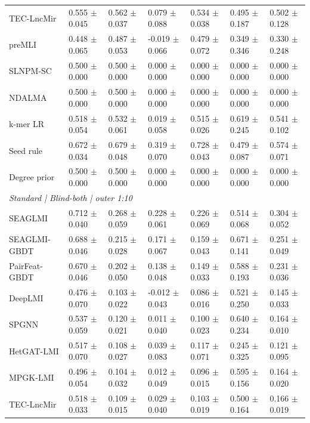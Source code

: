 \begin{landscape}
{\begin{longtable}{lllllll}
TEC-LncMir & 0.555 $\pm$ 0.045 & 0.562 $\pm$ 0.037 & 0.079 $\pm$ 0.088 & 0.534 $\pm$ 0.038 & 0.495 $\pm$ 0.187 & 0.502 $\pm$ 0.128 \\
preMLI & 0.448 $\pm$ 0.065 & 0.487 $\pm$ 0.053 & -0.019 $\pm$ 0.066 & 0.479 $\pm$ 0.072 & 0.349 $\pm$ 0.346 & 0.330 $\pm$ 0.248 \\
SLNPM-SC & 0.500 $\pm$ 0.000 & 0.500 $\pm$ 0.000 & 0.000 $\pm$ 0.000 & 0.000 $\pm$ 0.000 & 0.000 $\pm$ 0.000 & 0.000 $\pm$ 0.000 \\
NDALMA & 0.500 $\pm$ 0.000 & 0.500 $\pm$ 0.000 & 0.000 $\pm$ 0.000 & 0.000 $\pm$ 0.000 & 0.000 $\pm$ 0.000 & 0.000 $\pm$ 0.000 \\
k-mer LR & 0.518 $\pm$ 0.054 & 0.532 $\pm$ 0.061 & 0.019 $\pm$ 0.058 & 0.515 $\pm$ 0.026 & 0.619 $\pm$ 0.245 & 0.541 $\pm$ 0.102 \\
Seed rule & 0.672 $\pm$ 0.034 & 0.679 $\pm$ 0.048 & 0.319 $\pm$ 0.070 & 0.728 $\pm$ 0.043 & 0.479 $\pm$ 0.087 & 0.574 $\pm$ 0.071 \\
Degree prior & 0.500 $\pm$ 0.000 & 0.500 $\pm$ 0.000 & 0.000 $\pm$ 0.000 & 0.000 $\pm$ 0.000 & 0.000 $\pm$ 0.000 & 0.000 $\pm$ 0.000 \\
\multicolumn{7}{l}{\textit{Standard | Blind-both | outer 1:10}}\\
SEAGLMI & 0.712 $\pm$ 0.040 & 0.268 $\pm$ 0.059 & 0.228 $\pm$ 0.061 & 0.226 $\pm$ 0.069 & 0.514 $\pm$ 0.068 & 0.304 $\pm$ 0.052 \\
SEAGLMI-GBDT & 0.688 $\pm$ 0.046 & 0.215 $\pm$ 0.028 & 0.171 $\pm$ 0.067 & 0.159 $\pm$ 0.043 & 0.671 $\pm$ 0.141 & 0.251 $\pm$ 0.049 \\
PairFeat-GBDT & 0.670 $\pm$ 0.046 & 0.202 $\pm$ 0.050 & 0.138 $\pm$ 0.048 & 0.149 $\pm$ 0.033 & 0.588 $\pm$ 0.193 & 0.231 $\pm$ 0.036 \\
DeepLMI & 0.476 $\pm$ 0.070 & 0.103 $\pm$ 0.022 & -0.012 $\pm$ 0.043 & 0.086 $\pm$ 0.016 & 0.521 $\pm$ 0.250 & 0.145 $\pm$ 0.033 \\
SPGNN & 0.537 $\pm$ 0.059 & 0.120 $\pm$ 0.021 & 0.011 $\pm$ 0.040 & 0.100 $\pm$ 0.023 & 0.640 $\pm$ 0.234 & 0.164 $\pm$ 0.010 \\
HetGAT-LMI & 0.517 $\pm$ 0.070 & 0.108 $\pm$ 0.027 & 0.039 $\pm$ 0.083 & 0.117 $\pm$ 0.071 & 0.245 $\pm$ 0.325 & 0.121 $\pm$ 0.095 \\
MPGK-LMI & 0.496 $\pm$ 0.054 & 0.104 $\pm$ 0.032 & 0.012 $\pm$ 0.049 & 0.096 $\pm$ 0.015 & 0.595 $\pm$ 0.156 & 0.164 $\pm$ 0.020 \\
TEC-LncMir & 0.518 $\pm$ 0.033 & 0.109 $\pm$ 0.015 & 0.029 $\pm$ 0.040 & 0.103 $\pm$ 0.019 & 0.500 $\pm$ 0.164 & 0.166 $\pm$ 0.019 \\

\end{longtable}}
\end{landscape}
